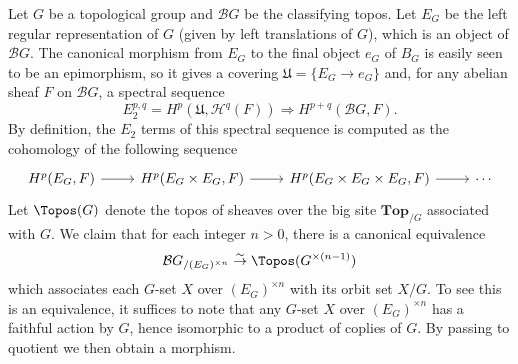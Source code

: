 \begin{example}
Let $G$ be a topological group and $\mathcal{B}G$ be the classifying topos. Let $E_G$ be the left regular representation of $G$ (given by left translations of $G$), which is an object of $\mathcal{B}G$. The canonical morphism from $E_G$ to the final object $e_G$ of $B_G$ is easily seen to be an epimorphism, so it gives a covering $\mathfrak{U}=\{E_G\to e_G\}$ and, for any abelian sheaf $F$ on $\mathcal{B}G$, a spectral sequence
\begin{equation}\label{topos BG spectral sequence of E_G to e_G}
E_2^{p,q}=H^p(\mathfrak{U},\mathcal{H}^q(F))\Rightarrow H^{p+q}(\mathcal{B}G,F).
\end{equation}
By definition, the $E_2$ terms of this spectral sequence is computed as the cohomology of the following sequence
\[\begin{tikzcd}
H^p(E_G,F)\ar[r]&H^p(E_G\times E_G,F)\ar[r]&H^p(E_G\times E_G\times E_G,F)\ar[r]&\cdots
\end{tikzcd}\]
Let $\Topos(G)$ denote the topos of sheaves over the big site $\mathbf{Top}_{/G}$ associated with $G$. We claim that for each integer $n>0$, there is a canonical equivalence
\[\mathcal{B}G_{/(E_G)^{\times n}} \stackrel{\sim}{\to } \Topos(G^{\times(n-1)})\]
which associates each $G$-set $X$ over $(E_G)^{\times n}$ with its orbit set $X/G$. To see this is an equivalence, it suffices to note that any $G$-set $X$ over $(E_G)^{\times n}$ has a faithful action by $G$, hence isomorphic to a product of coplies of $G$. By passing to quotient we then obtain a morphism.
\end{example}

